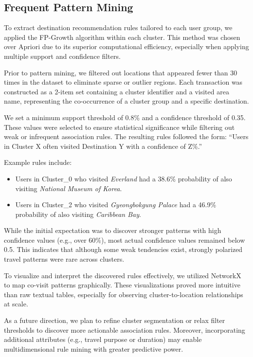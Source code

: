 \documentclass[sigconf]{acmart}
\begin{document}
\subsection{Frequent Pattern Mining}

To extract destination recommendation rules tailored to each user group, we applied the FP-Growth algorithm within each cluster. This method was chosen over Apriori due to its superior computational efficiency, especially when applying multiple support and confidence filters.

Prior to pattern mining, we filtered out locations that appeared fewer than 30 times in the dataset to eliminate sparse or outlier regions. Each transaction was constructed as a 2-item set containing a cluster identifier and a visited area name, representing the co-occurrence of a cluster group and a specific destination.

We set a minimum support threshold of 0.8\% and a confidence threshold of 0.35. These values were selected to ensure statistical significance while filtering out weak or infrequent association rules. The resulting rules followed the form: “Users in Cluster X often visited Destination Y with a confidence of Z\%.”

Example rules include:
\begin{itemize}
  \item Users in Cluster\_0 who visited \textit{Everland} had a 38.6\% probability of also visiting \textit{National Museum of Korea}.
  \item Users in Cluster\_2 who visited \textit{Gyeongbokgung Palace} had a 46.9\% probability of also visiting \textit{Caribbean Bay}.
\end{itemize}

While the initial expectation was to discover stronger patterns with high confidence values (e.g., over 60\%), most actual confidence values remained below 0.5. This indicates that although some weak tendencies exist, strongly polarized travel patterns were rare across clusters.

To visualize and interpret the discovered rules effectively, we utilized NetworkX to map co-visit patterns graphically. These visualizations proved more intuitive than raw textual tables, especially for observing cluster-to-location relationships at scale.

As a future direction, we plan to refine cluster segmentation or relax filter thresholds to discover more actionable association rules. Moreover, incorporating additional attributes (e.g., travel purpose or duration) may enable multidimensional rule mining with greater predictive power.
\end{document}
